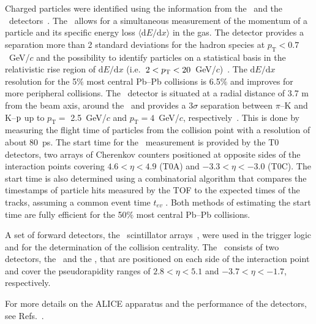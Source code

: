 Charged particles were identified using the information from the \TPC~and the \TOF~detectors~\cite{Aamodt:2008zz}. The \TPC~allows for a simultaneous measurement of the momentum of a particle and its specific energy loss $\langle \mathrm{d}E/\mathrm{d}x \rangle$ in the gas. The detector provides a separation more than 2 standard deviations for the hadron species at $p_{\mathrm{T}} < 0.7$~GeV/$c$ and the possibility to identify particles on a statistical basis in the relativistic rise region of $\mathrm{d}E/\mathrm{d}x$ (i.e.~$2 < p_{\rm{T}} < 20$~GeV/$c$)~\cite{Abelev:2014ffa}. The $\mathrm{d}E/\mathrm{d}x$ resolution for the 5$\%$ most central Pb--Pb collisions is 6.5$\%$ and improves for more peripheral collisions. The \TOF~detector is situated at a radial distance of 3.7 m from the beam axis, around the \TPC~and provides a $3\sigma$ separation between $\pi$--K and K--$\rm{p}$ up to $p_{\mathrm{T}} = $ 2.5~GeV/$c$ and $p_{\mathrm{T}} = 4$~GeV/$c$, respectively~\cite{Abelev:2014ffa}. This is done by measuring the flight time of particles from the collision point with a resolution of about $80$~ps. The start time for the \TOF~measurement is provided by the T0 detectors, two arrays of Cherenkov counters positioned at opposite sides of the interaction points covering $4.6 < \eta < 4.9$ (T0A) and $-3.3 < \eta < -3.0$ (T0C). The start time is also determined using a combinatorial algorithm that compares the timestamps of particle hits measured by the TOF to the expected times of the tracks, assuming a common event time $t_{ev}$ \cite{Abelev:2014ffa}. Both methods of estimating the start time are fully efficient for the 50$\%$ most central Pb--Pb collisions.

A set of forward detectors, the \VZERO~scintillator arrays~\cite{Abbas:2013taa}, were used in the trigger logic and for the determination of the collision centrality. The \VZERO~consists of two detectors, the \VZEROA~and the \VZEROC, that are positioned on each side of the interaction point and cover the pseudorapidity ranges of $2.8 < \eta < 5.1$ and $-3.7 < \eta < -1.7$, respectively. 

For more details on the ALICE apparatus and the performance of the detectors, see Refs.~\cite{Aamodt:2008zz,Abelev:2014ffa}.
